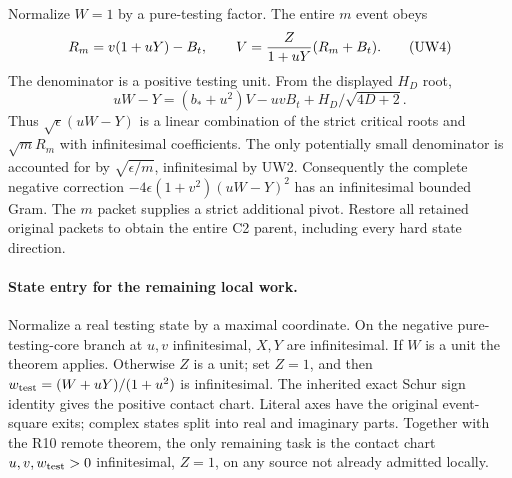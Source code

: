 Normalize $W=1$ by a pure-testing factor. The entire $m$ event obeys
\[
 R_m=v(1+uY)-B_t,\qquad
 V={Z\over1+uY}(R_m+B_t).                         \tag{UW4}
\]
The denominator is a positive testing unit. From the displayed
$H_D$ root,
\[
 uW-Y=(b_*+u^2)V-uvB_t+H_D/\sqrt{4D+2}.
\]
Thus $\sqrt\epsilon(uW-Y)$ is a linear combination of the strict
critical roots and $\sqrt mR_m$ with infinitesimal coefficients.
The only potentially small denominator is accounted for by
$\sqrt{\epsilon/m}$, infinitesimal by UW2. Consequently the complete
negative correction $-4\epsilon(1+v^2)(uW-Y)^2$ has an
infinitesimal bounded Gram. The $m$ packet supplies a strict additional
pivot. Restore all retained original packets to obtain the entire
C2 parent, including every hard state direction.

\paragraph{State entry for the remaining local work.}
Normalize a real testing state by a maximal coordinate. On the
negative pure-testing-core branch at $u,v$ infinitesimal, $X,Y$
are infinitesimal. If $W$ is a unit the theorem applies. Otherwise
$Z$ is a unit; set $Z=1$, and then
$w_{\rm test}=(W+uY)/(1+u^2)$ is infinitesimal. The inherited exact
Schur sign identity gives the positive contact chart. Literal axes
have the original event-square exits; complex states split into real
and imaginary parts. Together with the R10 remote theorem, the only
remaining task is the contact chart $u,v,w_{\rm test}>0$
infinitesimal, $Z=1$, on any source not already admitted locally.
